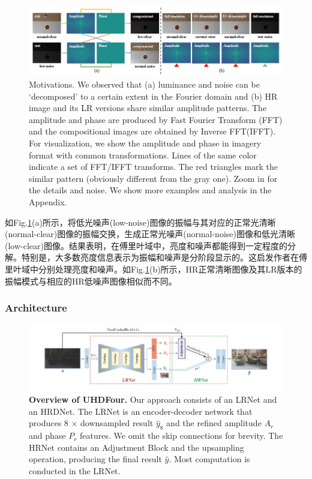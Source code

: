 \documentclass[letterpaper,10pt]{article}
\begin{document}
	\begin{figure}[htbp]
		\centering 
		\includegraphics[width=0.8\columnwidth]{picture/Motivations}
		\caption{
			\label{fig: Motivations} Motivations. We observed that (a) luminance and noise can be ‘decomposed’ to a certain extent in the Fourier domain and (b) HR image and its LR versions share similar amplitude patterns. The amplitude and phase are produced by Fast Fourier Transform (FFT) and the compositional images are obtained by Inverse FFT(IFFT). For visualization, we show the amplitude and phase in imagery format with common transformations. Lines of the same color indicate a set of FFT/IFFT transforms. The red triangles mark the similar pattern (obviously different from the gray one). Zoom in for the details and noise. We show more examples and analysis in the Appendix.
		}
	\end{figure}
	
	如Fig.\ref{fig: Motivations}(a)所示，将低光噪声(low-noise)图像的振幅与其对应的正常光清晰(normal-clear)图像的振幅交换，生成正常光噪声(normal-noise)图像和低光清晰(low-clear)图像。结果表明，在傅里叶域中，亮度和噪声都能得到一定程度的分解。特别是，大多数亮度信息表示为振幅和噪声是分阶段显示的。这启发作者在傅里叶域中分别处理亮度和噪声。如Fig.\ref{fig: Motivations}(b)所示，HR正常清晰图像及其LR版本的振幅模式与相应的HR低噪声图像相似而不同。
	
	\subsubsection{Architecture}
		
	\begin{figure}[htbp]
		\centering 
		\includegraphics[width=0.8\columnwidth]{picture/UHDFour-architecture}
		\caption{
			\label{fig: UHDFour architecture} \textbf{Overview of UHDFour.} Our approach consists of an LRNet and an HRDNet. The LRNet is an encoder-decoder network that produces 8 $\times$ downsampled result $\hat{y}_{8}$ and the refined amplitude $A_{r}$ and phase $P_{r}$ features. We omit the skip connections for brevity. The HRNet contains an Adjustment Block and the upsampling operation, producing the final result $\hat{y}$. Most computation is conducted in the LRNet.
		}
	\end{figure}
	
\end{document}
